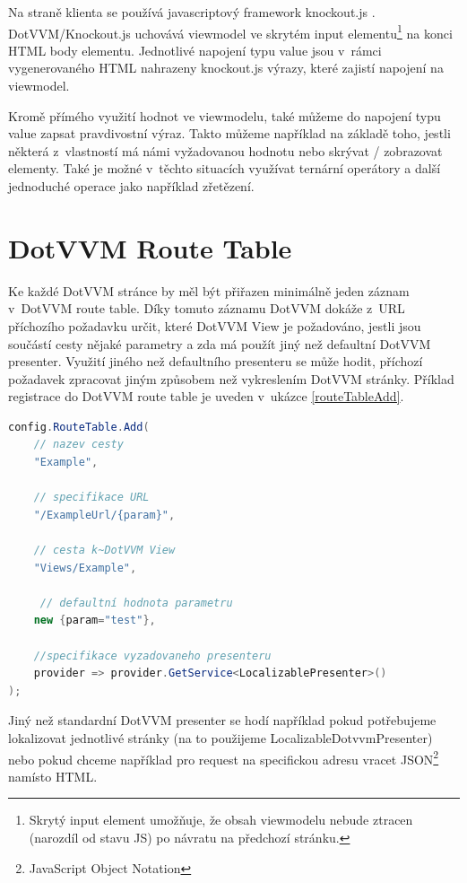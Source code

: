 Na straně klienta se používá javascriptový framework knockout.js . DotVVM/Knockout.js uchovává viewmodel ve skrytém input elementu\footnote{Skrytý input element umožňuje, že obsah viewmodelu nebude ztracen (narozdíl od stavu JS) po návratu na předchozí stránku.} na konci HTML body elementu. Jednotlivé napojení typu value jsou v~rámci vygenerovaného HTML nahrazeny knockout.js výrazy, které zajistí napojení na viewmodel.

Kromě přímého využití hodnot ve viewmodelu, také můžeme do napojení typu value zapsat pravdivostní výraz. Takto můžeme například na základě toho, jestli některá z~vlastností má námi vyžadovanou hodnotu nebo skrývat / zobrazovat elementy. Také je možné v~těchto situacích využívat ternární operátory a další jednoduché operace jako například zřetězení. 
\section{DotVVM Route Table}
Ke každé DotVVM stránce by měl být přiřazen minimálně jeden záznam v~DotVVM route table\cite{DotVVM-Routing}. Díky tomuto záznamu DotVVM dokáže z~URL příchozího požadavku určit, které DotVVM View je požadováno, jestli jsou součástí cesty nějaké parametry a zda má použít jiný než defaultní DotVVM presenter. Využití jiného než defaultního presenteru se může hodit, příchozí požadavek zpracovat jiným způsobem než vykreslením DotVVM stránky. Příklad registrace do DotVVM route table je uveden v~ukázce \ref{routeTableAdd}.
\begin{lstlisting}[language=C#, caption=Ukázka přidání záznamu do DotVVM route table v~rámci DotvvmStartup.cs.,label=routeTableAdd,captionpos=t]
config.RouteTable.Add(
    // nazev cesty
    "Example",
    
    // specifikace URL
    "/ExampleUrl/{param}",
    
    // cesta k~DotVVM View
    "Views/Example", 
    
     // defaultní hodnota parametru
    new {param="test"},
    
    //specifikace vyzadovaneho presenteru
    provider => provider.GetService<LocalizablePresenter>()
);
\end{lstlisting}

Jiný než standardní DotVVM presenter se hodí například pokud potřebujeme lokalizovat jednotlivé stránky (na to použijeme LocalizableDotvvmPresenter) nebo pokud chceme například pro request na specifickou adresu vracet JSON\footnote{JavaScript Object Notation} namísto HTML.
